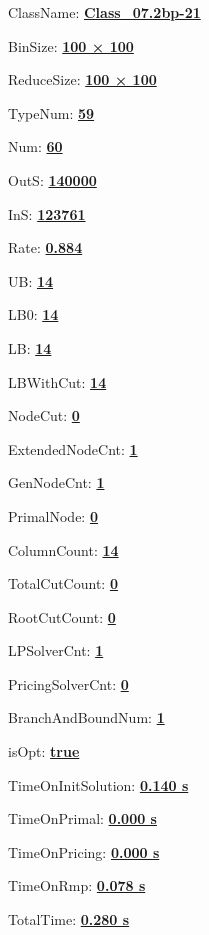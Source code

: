 \documentclass[11pt]{article}
\begin{document}
\pagestyle{empty}


ClassName: \underline{\textbf{Class_07.2bp-21}}
\par
BinSize: \underline{\textbf{100 × 100}}
\par
ReduceSize: \underline{\textbf{100 × 100}}
\par
TypeNum: \underline{\textbf{59}}
\par
Num: \underline{\textbf{60}}
\par
OutS: \underline{\textbf{140000}}
\par
InS: \underline{\textbf{123761}}
\par
Rate: \underline{\textbf{0.884}}
\par
UB: \underline{\textbf{14}}
\par
LB0: \underline{\textbf{14}}
\par
LB: \underline{\textbf{14}}
\par
LBWithCut: \underline{\textbf{14}}
\par
NodeCut: \underline{\textbf{0}}
\par
ExtendedNodeCnt: \underline{\textbf{1}}
\par
GenNodeCnt: \underline{\textbf{1}}
\par
PrimalNode: \underline{\textbf{0}}
\par
ColumnCount: \underline{\textbf{14}}
\par
TotalCutCount: \underline{\textbf{0}}
\par
RootCutCount: \underline{\textbf{0}}
\par
LPSolverCnt: \underline{\textbf{1}}
\par
PricingSolverCnt: \underline{\textbf{0}}
\par
BranchAndBoundNum: \underline{\textbf{1}}
\par
isOpt: \underline{\textbf{true}}
\par
TimeOnInitSolution: \underline{\textbf{0.140 s}}
\par
TimeOnPrimal: \underline{\textbf{0.000 s}}
\par
TimeOnPricing: \underline{\textbf{0.000 s}}
\par
TimeOnRmp: \underline{\textbf{0.078 s}}
\par
TotalTime: \underline{\textbf{0.280 s}}
\par
\newpage


\end{document}
